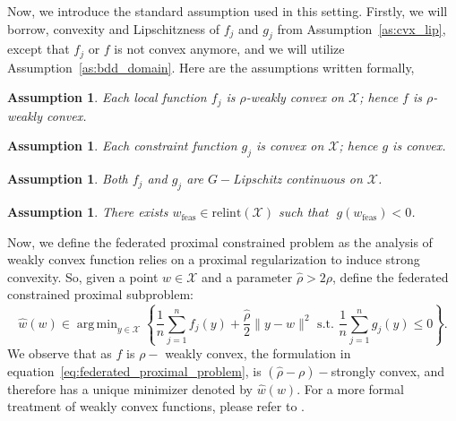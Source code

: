 \documentclass{article} %
\newtheorem{assumption}[]{Assumption}
\DeclareMathOperator*{\argmin}{arg\,min}
\def\eqref#1{equation~\ref{#1}}
\begin{document}
Now, we introduce the standard assumption used in this setting. Firstly, we will borrow, convexity and Lipschitzness of $f_j$ and $g_j$ from Assumption~\ref{as:cvx_lip}, except that $f_j$ or $f$ is not convex anymore, and we will utilize Assumption~\ref{as:bdd_domain}. Here are the assumptions written formally,
\begin{assumption}
    \label{as:weakly_cvx_f}
    Each local function $f_j$ is $\rho$-weakly convex on $\mathcal{X}$; hence $f$ is $\rho$-weakly convex.
\end{assumption}
\begin{assumption}
    \label{as:cvx_g}
    Each constraint function $g_j$ is convex on $\mathcal{X}$; hence $g$ is convex.
\end{assumption}
\begin{assumption}
    \label{as:Lip_f_g}
    Both $f_j$ and $g_j$ are $G-$Lipschitz continuous on $\mathcal{X}$.
\end{assumption}
\begin{assumption}
    \label{as:slater}
    There exists $w_{\mathrm{feas}}\in\mathrm{relint}(\mathcal{X})$ such that
    $\;g(w_{\mathrm{feas}})<0$.
\end{assumption}
Now, we define the federated proximal constrained problem as the analysis of weakly convex function relies on a proximal regularization to induce strong convexity. So, given a point $w \in \mathcal{X}$ and a parameter $\hat{\rho}>2\rho$, define the 
{federated constrained proximal subproblem}:
\begin{equation}
\label{eq:federated_proximal_problem}
\hat w(w) 
\in \argmin_{y\in\mathcal{X}}
\left\{
    \frac{1}{n}\sum_{j=1}^n f_j(y)
    + \frac{\hat{\rho}}{2}\|y-w\|^2 
    \text{ s.t. }
    \frac{1}{n}\sum_{j=1}^n g_j(y) \le 0
\right\}.
\end{equation}
We observe that as $f$ is $\rho-$ weakly convex, the formulation in \eqref{eq:federated_proximal_problem}, is $(\hat{\rho} - \rho)-$strongly convex, and therefore has a unique minimizer denoted by $\hat{w}(w)$. For a more formal treatment of weakly convex functions, please refer to \citet{huang2023oracle}.
\end{document}
